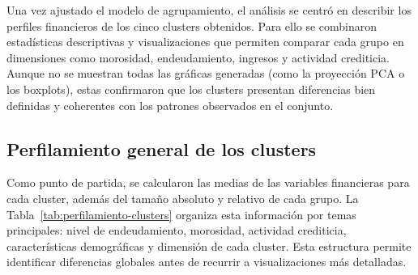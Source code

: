\documentclass[a4paper,12pt]{article}
\begin{document}
Una vez ajustado el modelo de agrupamiento, el análisis se centró en describir los perfiles financieros de los 
cinco clusters obtenidos. Para ello se combinaron estadísticas descriptivas y visualizaciones que permiten comparar 
cada grupo en dimensiones como morosidad, endeudamiento, ingresos y actividad crediticia. Aunque no se muestran 
todas las gráficas generadas (como la proyección PCA o los boxplots), estas confirmaron que los clusters presentan 
diferencias bien definidas y coherentes con los patrones observados en el conjunto.

\subsection{Perfilamiento general de los clusters}

Como punto de partida, se calcularon las medias de las variables financieras para cada cluster, además del tamaño 
absoluto y relativo de cada grupo. La Tabla~\ref{tab:perfilamiento-clusters} organiza esta información por temas 
principales: nivel de endeudamiento, morosidad, actividad crediticia, características demográficas y dimensión de 
cada cluster. Esta estructura permite identificar diferencias globales antes de recurrir a visualizaciones más detalladas.
\end{document}
